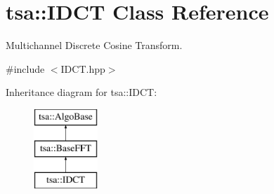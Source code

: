 \hypertarget{classtsa_1_1_i_d_c_t}{}\section{tsa\+:\+:I\+D\+CT Class Reference}
\label{classtsa_1_1_i_d_c_t}


Multichannel Discrete Cosine Transform.  




{\ttfamily \#include $<$I\+D\+C\+T.\+hpp$>$}

Inheritance diagram for tsa\+:\+:I\+D\+CT\+:\begin{figure}[H]
\begin{center}
\leavevmode
\includegraphics[height=3.000000cm]{classtsa_1_1_i_d_c_t}
\end{center}
\end{figure}
